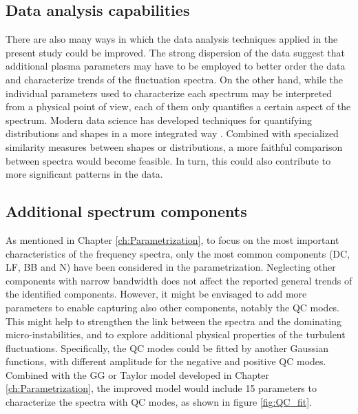 \subsection*{Data analysis capabilities}

There are also many ways in which the data analysis techniques applied in the present study could be improved. The strong dispersion of the data suggest that additional plasma parameters may have to be employed to better order the data and characterize trends of the fluctuation spectra. On the other hand, while the individual parameters used to characterize each spectrum may be interpreted from a physical point of view, each of them only quantifies a certain aspect of the spectrum. Modern data science has developed techniques for quantifying distributions and shapes in a more integrated way \cite{Shabbir_2016_RSI}. Combined with specialized similarity measures between shapes or distributions, a more faithful comparison between spectra would become feasible. In turn, this could also contribute to more significant patterns in the data.


\subsection*{Additional spectrum components}

As mentioned in Chapter \ref{ch:Parametrization}, to focus on the most important characteristics of the frequency spectra, only the most common components (DC, LF, BB and N) have been considered in the parametrization. Neglecting other components with narrow bandwidth does not affect the reported general trends of the identified components. However, it might be envisaged to add more parameters to enable capturing also other components, notably the QC modes. This might help to strengthen the link between the spectra and the dominating micro-instabilities, and to explore additional physical properties of the turbulent fluctuations. Specifically, the QC modes could be fitted by another Gaussian functions, with different amplitude for the negative and positive QC modes. Combined with the GG or Taylor model developed in Chapter \ref{ch:Parametrization}, the improved model would include 15 parameters to characterize the spectra with QC modes, as shown in figure \ref{fig:QC_fit}.

